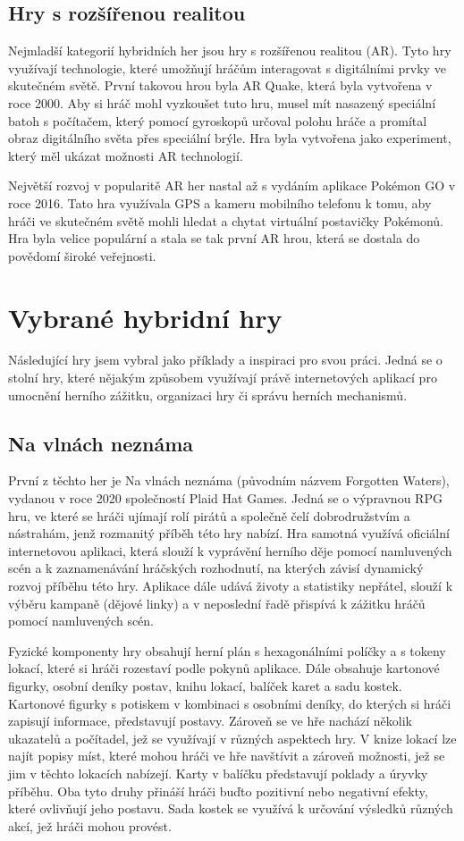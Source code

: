 \subsection{Hry s rozšířenou realitou}
Nejmladší kategorií hybridních her jsou hry s rozšířenou realitou (AR). Tyto hry využívají technologie, které umožňují hráčům interagovat s digitálními prvky ve skutečném světě. První takovou hrou byla AR Quake, která byla vytvořena v roce 2000. Aby si hráč mohl vyzkoušet tuto hru, musel mít nasazený speciální batoh s počítačem, který pomocí gyroskopů určoval polohu hráče a promítal obraz digitálního světa přes speciální brýle. Hra byla vytvořena jako experiment, který měl ukázat možnosti AR technologií.\cite{ar_history}

Největší rozvoj v popularitě AR her nastal až s vydáním aplikace Pokémon GO v roce 2016. Tato hra využívala GPS a kameru mobilního telefonu k tomu, aby hráči ve skutečném světě mohli hledat a chytat virtuální postavičky Pokémonů. Hra byla velice populární a stala se tak první AR hrou, která se dostala do povědomí široké veřejnosti.

\section{Vybrané hybridní hry}
Následující hry jsem vybral jako příklady a inspiraci pro svou práci. Jedná se o stolní hry, které nějakým způsobem využívají právě internetových aplikací pro umocnění herního zážitku, organizaci hry či správu herních mechanismů.

\subsection{Na vlnách neznáma}
První z těchto her je Na vlnách neznáma (původním názvem Forgotten Waters), vydanou v roce 2020 společností Plaid Hat Games. Jedná se o výpravnou RPG hru, ve které se hráči ujímají rolí pirátů a společně čelí dobrodružstvím a nástrahám, jenž rozmanitý příběh této hry nabízí. Hra samotná využívá oficiální internetovou aplikaci\cite{forgotten_waters_app}, která slouží k vyprávění herního děje pomocí namluvených scén a k zaznamenávání hráčských rozhodnutí, na kterých závisí dynamický rozvoj příběhu této hry. Aplikace dále udává životy a statistiky nepřátel, slouží k výběru kampaně (dějové linky) a v neposlední řadě přispívá k zážitku hráčů pomocí namluvených scén.

Fyzické komponenty hry obsahují herní plán s hexagonálními políčky a s tokeny lokací, které si hráči rozestaví podle pokynů aplikace. Dále obsahuje kartonové figurky, osobní deníky postav, knihu lokací, balíček karet a sadu kostek. Kartonové figurky s potiskem v kombinaci s osobními deníky, do kterých si hráči zapisují informace, představují postavy. Zároveň se ve hře nachází několik ukazatelů a počítadel, jež se využívají v různých aspektech hry. V knize lokací lze najít popisy míst, které mohou hráči ve hře navštívit a zároveň možnosti, jež se jim v těchto lokacích nabízejí. Karty v balíčku představují poklady a úryvky příběhu. Oba tyto druhy přináší hráči buďto pozitivní nebo negativní efekty, které ovlivňují jeho postavu. Sada kostek se využívá k určování výsledků různých akcí, jež hráči mohou provést.


